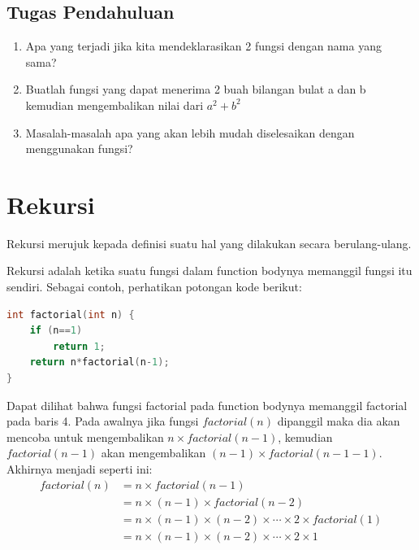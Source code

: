 \subsection{Tugas Pendahuluan}
\begin{enumerate}
    \item Apa yang terjadi jika kita mendeklarasikan 2 fungsi dengan nama yang sama?
    \item Buatlah fungsi yang dapat menerima 2 buah bilangan bulat a dan b kemudian mengembalikan nilai dari $a^2 + b^2$
    \item Masalah-masalah apa yang akan lebih mudah diselesaikan dengan menggunakan fungsi?
\end{enumerate}

\section{Rekursi}
Rekursi merujuk kepada definisi suatu hal yang dilakukan secara berulang-ulang.

Rekursi adalah ketika suatu fungsi dalam function bodynya memanggil fungsi itu sendiri.
Sebagai contoh, perhatikan potongan kode berikut:
\begin{lstlisting}[language=c,caption = Factorial dengan rekursi,label=lst:recursionexample01]
int factorial(int n) {
    if (n==1)
        return 1;
    return n*factorial(n-1);
}
\end{lstlisting}
Dapat dilihat bahwa fungsi factorial pada function bodynya memanggil factorial pada baris 4.
Pada awalnya jika fungsi $factorial(n)$ dipanggil maka dia akan mencoba untuk mengembalikan
$n\times factorial(n-1)$, kemudian $factorial(n-1)$ akan mengembalikan $(n-1)\times factorial(n-1-1)$.
Akhirnya menjadi seperti ini:
\begin{equation*}
    \begin{split}
        factorial(n)& = n \times factorial(n-1)\\
        & = n \times (n-1) \times factorial(n-2)\\
        & = n \times (n-1) \times (n-2) \times \cdots \times 2 \times factorial(1)\\
        & = n \times (n-1) \times (n-2) \times \cdots \times 2 \times 1\\
    \end{split}
\end{equation*}

